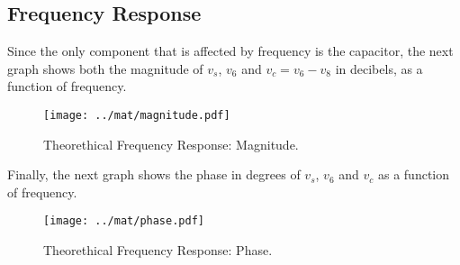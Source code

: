 \subsection{Frequency Response}
Since the only component that is affected by frequency is the capacitor, the next graph shows both the magnitude of $v_s$, $v_6$ and $v_c=v_6 - v_8$ in decibels, as a function of frequency. 

\begin{figure}[H] \centering
\texttt{[image: ../mat/magnitude.pdf]}
\caption{Theorethical Frequency Response: Magnitude.}
\label{fig:sim_op}
\end{figure}

Finally, the next graph shows the phase in degrees of $v_s$, $v_6$ and $v_c$ as a function of frequency.

\begin{figure}[H] \centering
\texttt{[image: ../mat/phase.pdf]}
\caption{Theorethical Frequency Response: Phase.}
\label{fig:sim_op}
\end{figure}


